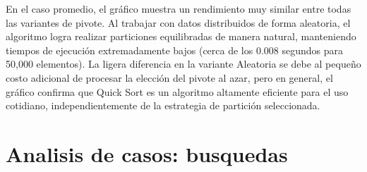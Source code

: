\documentclass[9pt,letterpaper,onecolumn]{rho-class/rho}
\begin{document}
                En el caso promedio, el gráfico muestra un rendimiento muy similar entre todas las variantes de pivote. Al trabajar con datos distribuidos de
                 forma aleatoria, el algoritmo logra realizar particiones equilibradas de manera natural, manteniendo tiempos de ejecución extremadamente bajos
                  (cerca de los 0.008 segundos para 50,000 elementos). La ligera diferencia en la variante Aleatoria se debe al pequeño costo adicional de 
                  procesar la elección del pivote al azar, pero en general, el gráfico confirma que Quick Sort es un algoritmo altamente eficiente para 
                  el uso cotidiano, independientemente de la estrategia de partición seleccionada.


\newpage
\section{Analisis de casos: busquedas}
\end{document}

